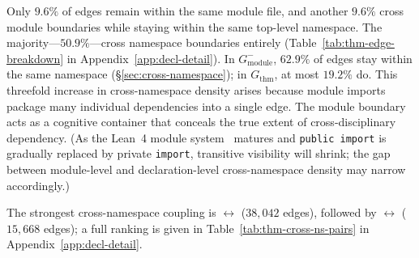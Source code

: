 Only $9.6\%$ of edges remain within the same module file, and another $9.6\%$ cross module boundaries while staying within the same top-level namespace. The majority---$50.9\%$---cross namespace boundaries entirely (Table~\ref{tab:thm-edge-breakdown} in Appendix~\ref{app:decl-detail}). In $G_{\mathrm{module}}^{-}$, $62.9\%$ of edges stay within the same namespace (\S\ref{sec:cross-namespace}); in $G_{\mathrm{thm}}$, at most $19.2\%$ do. This threefold increase in cross-namespace density arises because module imports package many individual dependencies into a single edge. The module boundary acts as a cognitive container that conceals the true extent of cross-disciplinary dependency. (As the Lean~4 module system~\cite{lean4modules} matures and \texttt{public import} is gradually replaced by private \texttt{import}, transitive visibility will shrink; the gap between module-level and declaration-level cross-namespace density may narrow accordingly.)

The strongest cross-namespace coupling is  $\leftrightarrow$  ($38{,}042$ edges), followed by  $\leftrightarrow$  ($15{,}668$ edges); a full ranking is given in Table~\ref{tab:thm-cross-ns-pairs} in Appendix~\ref{app:decl-detail}.


